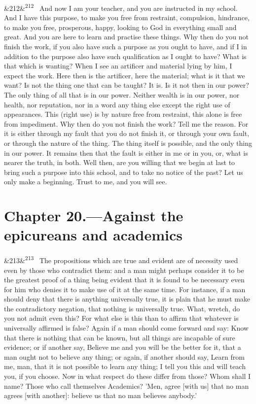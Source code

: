 \documentclass[12pt]{article}
\newcommand{\para}[1][]{\par\noindent\ifx&#1&\else\textsuperscript{\footnotesize #1}~\fi}
\begin{document}
\para[212] And now I am your teacher, and you are instructed in my school. And I have this purpose, to make you free from restraint, compulsion, hindrance, to make you free, prosperous, happy, looking to God in everything small and great. And you are here to learn and practise these things. Why then do you not finish the work, if you also have such a purpose as you ought to have, and if I in addition to the purpose also have such qualification as I ought to have? What is that which is wanting? When I see an artificer and material lying by him, I expect the work. Here then is the artificer, here the material; what is it that we want? Is not the thing one that can be taught? It is. Is it not then in our power? The only thing of all that is in our power. Neither wealth is in our power, nor health, nor reputation, nor in a word any thing else except the right use of appearances. This (right use) is by nature free from restraint, this alone is free from impediment. Why then do you not finish the work? Tell me the reason. For it is either through my fault that you do not finish it, or through your own fault, or through the nature of the thing. The thing itself is possible, and the only thing in our power. It remains then that the fault is either in me or in you, or, what is nearer the truth, in both. Well then, are you willing that we begin at last to bring such a purpose into this school, and to take no notice of the past? Let us only make a beginning. Trust to me, and you will see.

\section*{Chapter 20.---Against the epicureans and academics}

\para[213] The propositions which are true and evident are of necessity used even by those who contradict them: and a man might perhaps consider it to be the greatest proof of a thing being evident that it is found to be necessary even for him who denies it to make use of it at the same time. For instance, if a man should deny that there is anything universally true, it is plain that he must make the contradictory negation, that nothing is universally true. What, wretch, do you not admit even this? For what else is this than to affirm that whatever is universally affirmed is false? Again if a man should come forward and say: Know that there is nothing that can be known, but all things are incapable of sure evidence; or if another say, Believe me and you will be the better for it, that a man ought not to believe any thing; or again, if another should say, Learn from me, man, that it is not possible to learn any thing; I tell you this and will teach you, if you choose. Now in what respect do these differ from those? Whom shall I name? Those who call themselves Academics? 'Men, agree [with us] that no man agrees [with another]: believe us that no man believes anybody.'
\end{document}
